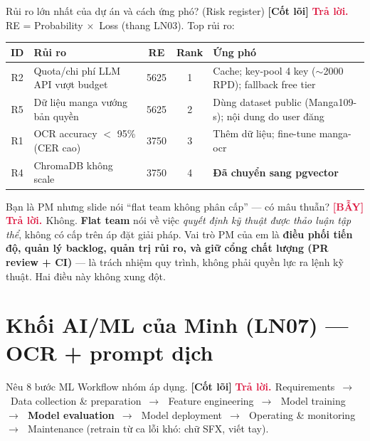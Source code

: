 \documentclass[11pt]{article}
\newcommand{\arr}{\,\ensuremath{\rightarrow}\,}
\newcommand{\x}{\ensuremath{\times}}
\newcommand{\tagCore}{\textcolor{steel}{\footnotesize\textbf{[Cốt lõi]}}}
\newcommand{\tagTrap}{\textcolor{crimson}{\footnotesize\textbf{[BẪY]}}}
\newcommand{\A}{\textbf{\textcolor{crimson}{Trả lời. }}}
\begin{document}
\begin{qa}{Rủi ro lớn nhất của dự án và cách ứng phó? (Risk register) \tagCore}
\A RE = Probability \x\ Loss (thang LN03). Top rủi ro:
\begin{center}\small
\begin{tabular}{clcc p{4.6cm}}
\toprule
ID & Rủi ro & RE & Rank & Ứng phó \\
\midrule
R2 & Quota/chi phí LLM API vượt budget & 5625 & 1 & Cache; key-pool 4 key ($\sim$2000 RPD); fallback free tier \\
R5 & Dữ liệu manga vướng bản quyền & 5625 & 2 & Dùng dataset public (Manga109-s); nội dung do user đăng \\
R1 & OCR accuracy $<$ 95\% (CER cao) & 3750 & 3 & Thêm dữ liệu; fine-tune manga-ocr \\
R4 & ChromaDB không scale & 3750 & 4 & \textbf{Đã chuyển sang pgvector} \\
\bottomrule
\end{tabular}
\end{center}
\end{qa}

\begin{qa}{Bạn là PM nhưng slide nói ``flat team không phân cấp'' --- có mâu thuẫn? \tagTrap}
\A Không. \textbf{Flat team} nói về việc \textit{quyết định kỹ thuật được thảo luận tập thể}, không có cấp trên áp đặt giải pháp. Vai trò PM của em là \textbf{điều phối tiến độ, quản lý backlog, quản trị rủi ro, và giữ cổng chất lượng (PR review + CI)} --- là trách nhiệm quy trình, không phải quyền lực ra lệnh kỹ thuật. Hai điều này không xung đột.
\end{qa}

\section{Khối AI/ML của Minh (LN07) --- OCR + prompt dịch}

\begin{qa}{Nêu 8 bước ML Workflow nhóm áp dụng. \tagCore}
\A Requirements \arr\ Data collection \& preparation \arr\ Feature engineering \arr\ Model training \arr\ \textbf{Model evaluation} \arr\ Model deployment \arr\ Operating \& monitoring \arr\ Maintenance (retrain từ ca lỗi khó: chữ SFX, viết tay).
\end{qa}
\end{document}

